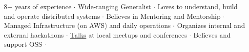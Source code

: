 

\begin{cvparagraph}
8+ years of experience ${\cdotp}$ Wide-ranging Generalist ${\cdotp}$ Loves to understand, build and operate distributed systems ${\cdotp}$ Believes in Mentoring and Mentorship ${\cdotp}$ Managed Infrastructure (on AWS) and daily operations ${\cdotp}$ Organizes internal and external hackathons ${\cdotp}$ \href{https://github.com/ashwanthkumar/talks}{Talks} at local meetups and conferences ${\cdotp}$ Believes and support OSS ${\cdotp}$
\end{cvparagraph}
